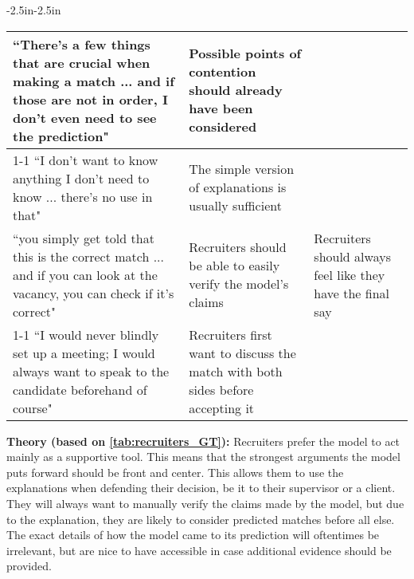 \begin{table*}[]
\begin{adjustwidth}{-2.5in}{-2.5in}
\begin{tabularx}{1.5\textwidth}{@{}X>{\raggedright\arraybackslash}p{6.5cm}>{\raggedright\arraybackslash}p{3.5cm}@{}}
``There's a few things that are crucial when making a match ... and if those are not in order, I don't even need to see the prediction" &
  Possible points of contention should already have been considered &
   \\ \cmidrule(r){1-1}
``I don't want to know anything I don't need to know ... there's no use in that" &
  The simple version of explanations is usually sufficient &
   \\ \midrule
``you simply get told that this is the correct match ... and if you can look at the vacancy, you can check if it's correct" &
  Recruiters should be able to easily verify the model's claims &
  Recruiters should always feel like they have the final say \\ \cmidrule(r){1-1}
``I would never blindly set up a meeting; I would always want to speak to the candidate beforehand of course" &
  Recruiters first want to discuss the match with both sides before accepting it &
   \\ \bottomrule
   
\end{tabularx}
\end{adjustwidth}
\label{tab:recruiters_GT}   
\end{table*}


\noindent \textbf{Theory (based on \cref{tab:recruiters_GT}):} Recruiters prefer the model to act mainly as a supportive tool. This means that the strongest arguments the model puts forward should be front and center. This allows them to use the explanations when defending their decision, be it to their supervisor or a client. They will always want to manually verify the claims made by the model, but due to the explanation, they are likely to consider predicted matches before all else. The exact details of how the model came to its prediction will oftentimes be irrelevant, but are nice to have accessible in case additional evidence should be provided. 

\newpage

